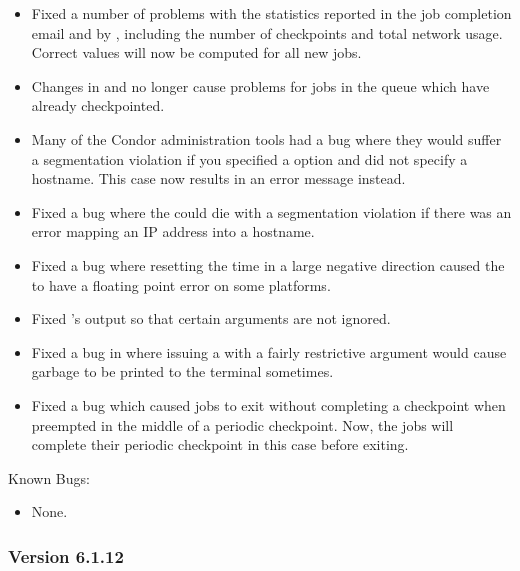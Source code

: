 \begin{itemize}
\item Fixed a number of problems with the statistics reported in the
job completion email and by  , including the
number of checkpoints and total network usage.  Correct values will
now be computed for all new jobs.

\item Changes in  and
 no longer cause problems for jobs in the
queue which have already checkpointed.

\item Many of the Condor administration tools had a bug where they
would suffer a segmentation violation if you specified a  
option and did not specify a hostname.
This case now results in an error message instead.

\item Fixed a bug where the  could die with a
segmentation violation if there was an error mapping an IP address
into a hostname.

\item Fixed a bug where resetting the time in a large negative direction
caused the  to have a floating point error on some
platforms.

\item Fixed 's output so that certain arguments are not ignored.

\item Fixed a bug in  where issuing a  with a
fairly restrictive  argument would cause garbage to be
printed to the terminal sometimes.

\item Fixed a bug which caused jobs to exit without completing a
checkpoint when preempted in the middle of a periodic checkpoint.
Now, the jobs will complete their periodic checkpoint in this case
before exiting.
\end{itemize}

\noindent Known Bugs:

\begin{itemize}

\item None.

\end{itemize}

\subsubsection{\label{sec:New-6-1-12}Version 6.1.12}

